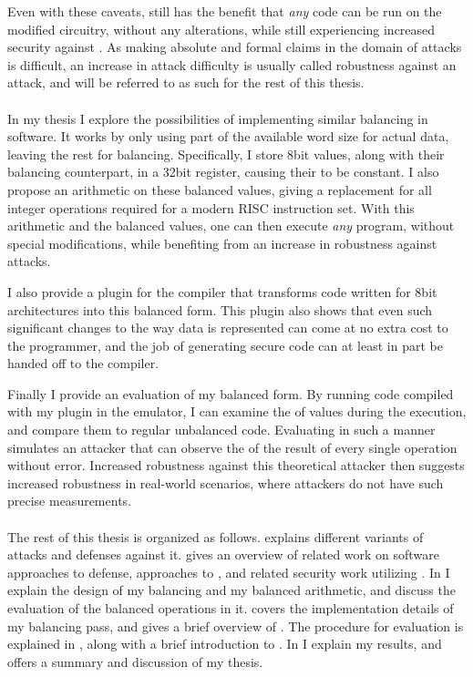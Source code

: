 Even with these caveats, \dual{} still has the benefit that \emph{any} code can be run on the modified circuitry, without any alterations, while still experiencing increased security against \poweranalysis{}.
As making absolute and formal claims in the domain of \sidechannel{} attacks is difficult, an increase in attack difficulty is usually called robustness against an attack, and will be referred to as such for the rest of this thesis.
\\
\\
In my thesis I explore the possibilities of implementing similar balancing in software.
It works by only using part of the available word size for actual data, leaving the rest for balancing.
Specifically, I store 8bit values, along with their balancing counterpart, in a 32bit register, causing their \hammingw{} to be constant.
I also propose an arithmetic on these balanced values, giving a replacement for all integer operations required for a modern RISC instruction set.
With this arithmetic and the balanced values, one can then execute \emph{any} program, without special modifications, while benefiting from an increase in robustness against \poweranalysis{} attacks.

I also provide a plugin for the \llvm{} compiler that transforms code written for 8bit architectures into this balanced form.
This plugin also shows that even such significant changes to the way data is represented can come at no extra cost to the programmer, and the job of generating secure code can at least in part be handed off to the compiler.

Finally I provide an evaluation of my balanced form.
By running code compiled with my plugin in the \qemu{} emulator, I can examine the \hammingw{} of values during the execution, and compare them to regular unbalanced code.
Evaluating in such a manner simulates an attacker that can observe the \hammingw{} of the result of every single operation without error.
Increased robustness against this theoretical attacker then suggests increased robustness in real-world scenarios, where attackers do not have such precise measurements.
\\
\\
The rest of this thesis is organized as follows.
 explains different variants of \poweranalysis{} attacks and defenses against it.
 gives an overview of related work on software approaches to \poweranalysis{} defense, approaches to \dual{}, and related security work utilizing \llvm{}.
In  I explain the design of my balancing and my balanced arithmetic, and discuss the evaluation of the balanced operations in it.
 covers the implementation details of my balancing pass, and gives a brief overview of \llvm{}.
The procedure for evaluation is explained in , along with a brief introduction to \qemu{}.
In  I explain my results, and  offers a summary and discussion of my thesis.
